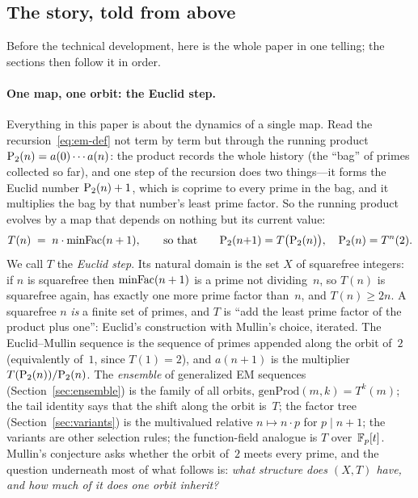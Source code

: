 \subsection*{The story, told from above}
\label{sec:story}

Before the technical development, here is the whole paper in one
telling; the sections then follow it in order.

\paragraph{One map, one orbit: the Euclid step.}
Everything in this paper is about the dynamics of a single map.  Read
the recursion~\eqref{eq:em-def} not term by term but through the running
product $\mathrm{P}_{2}(n) = a(0)\cdots a(n)$: the product records the whole
history (the ``bag'' of primes collected so far), and one step of the
recursion does two things---it forms the Euclid number $\mathrm{P}_{2}(n)+1$,
which is coprime to every prime in the bag, and it multiplies the bag by
that number's least prime factor.  So the running product evolves by a
map that depends on nothing but its current value:
\[
  T(n) \;=\; n \cdot \mathrm{minFac}(n+1),
  \qquad\text{so that}\qquad
  \mathrm{P}_{2}(n{+}1) = T\bigl(\mathrm{P}_{2}(n)\bigr),
  \quad \mathrm{P}_{2}(n) = T^{n}(2).
\]
We call $T$ the \emph{Euclid step}.  Its natural domain is the set $X$ of
squarefree integers: if $n$ is squarefree then $\mathrm{minFac}(n+1)$ is a prime
not dividing~$n$, so $T(n)$ is squarefree again, has exactly one more
prime factor than~$n$, and $T(n)\ge 2n$.  A squarefree $n$ \emph{is} a
finite set of primes, and $T$ is ``add the least prime factor of the
product plus one'': Euclid's construction with Mullin's choice, iterated.
The Euclid--Mullin sequence is the sequence of primes appended along the
orbit of~$2$ (equivalently of~$1$, since $T(1) = 2$), and $a(n{+}1)$ is
the multiplier $T(\mathrm{P}_{2}(n))/\mathrm{P}_{2}(n)$.  The \emph{ensemble} of
generalized EM sequences (Section~\ref{sec:ensemble}) is the family of
all orbits, $\mathrm{genProd}(m,k) = T^{k}(m)$; the tail identity says
that the shift along the orbit is~$T$; the factor tree
(Section~\ref{sec:variants}) is the multivalued relative
$n \mapsto n\cdot p$ for $p \mid n+1$; the variants are other selection
rules; the function-field analogue is $T$ over~$\mathbb{F}_p[t]$.  Mullin's
conjecture asks whether the orbit of~$2$ meets every prime, and the
question underneath most of what follows is: \emph{what structure does
$(X,T)$ have, and how much of it does one orbit inherit?}

